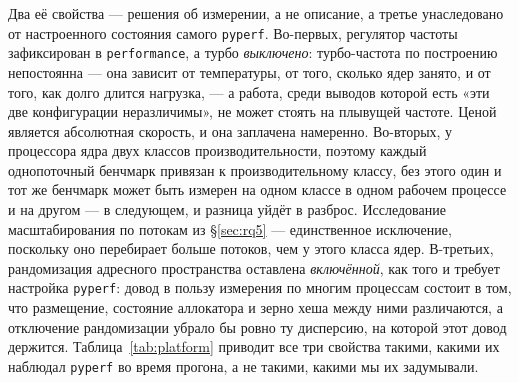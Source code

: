 \documentclass[10pt,a4paper]{article}
\newcommand{\code}[1]{\texttt{\small #1}}
\begin{document}
Два её свойства --- решения об измерении, а не описание, а третье унаследовано от
настроенного состояния самого \code{pyperf}. Во-первых, регулятор частоты зафиксирован в
\code{performance}, а турбо \emph{выключено}: турбо-частота по построению непостоянна --- она
зависит от температуры, от того, сколько ядер занято, и от того, как долго длится нагрузка, --- а
работа, среди выводов которой есть «эти две конфигурации неразличимы», не может стоять на
плывущей частоте. Ценой является абсолютная скорость, и она заплачена намеренно. Во-вторых, у
процессора ядра двух классов производительности, поэтому каждый однопоточный бенчмарк привязан к
производительному классу, без этого один и тот же бенчмарк может быть измерен на одном классе в
одном рабочем процессе и на другом --- в следующем, и разница уйдёт в разброс. Исследование
масштабирования по потокам из \S\ref{sec:rq5} --- единственное исключение, поскольку оно перебирает
больше потоков, чем у этого класса ядер. В-третьих, рандомизация адресного пространства оставлена
\emph{включённой}, как того и требует настройка \code{pyperf}:
довод в пользу измерения по многим процессам состоит в том, что размещение, состояние аллокатора и
зерно хеша между ними различаются, а отключение рандомизации убрало бы ровно ту дисперсию, на
которой этот довод держится. Таблица~\ref{tab:platform} приводит все три свойства такими, какими их
наблюдал \code{pyperf} во время прогона, а не такими, какими мы их задумывали.

\begin{table}[t]
  \centering
  \caption{Хост измерений. Каждое поле считано из артефакта, который произвёл прогон: из описания
  машины, записанного на самом хосте, и из метаданных \code{pyperf} по каждому прогону.}
  \label{tab:platform}
  \small
  
\end{table}

\begin{table}[t]
  \centering
  \caption{Измеренный набор инструментов. Каждая версия здесь --- та, которую скрипты сборки
  закрепляют и ставят, а \code{bench/plots/check\_versions.py} падает, если установлено иное.
  Поэтому таблица говорит о том, что действительно работало, а не о том, что когда-то записали.}
  \label{tab:versions}
  \small
  
\end{table}
\end{document}
